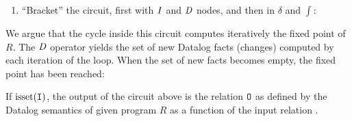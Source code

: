 \begin{algorithm}
\begin{enumerate}[nosep, leftmargin=\parindent]
\item ``Bracket'' the circuit, first with $\mathit{I}$ and $\mathit{D}$ nodes, and
  then in $\delta$ and $\int$:

\begin{center}
    \vspace{-2ex}
\end{center}
\end{enumerate}
\end{algorithm}

We argue that the cycle inside this circuit computes iteratively the fixed point of $R$.
The $\mathit{D}$ operator yields the set of new Datalog facts (changes) computed by each iteration of the loop.
When the set of new facts becomes empty, the fixed point has been reached:

\begin{theorem}\label{theorem:recursion}
If $\mbox{isset}(\mbox{\texttt{I}})$, the output of the circuit above is
the relation $\mbox{\texttt{O}}$ as defined by the Datalog semantics of given program
$R$ as a function of the input relation .
\end{theorem}
\label{proof-recursion}

